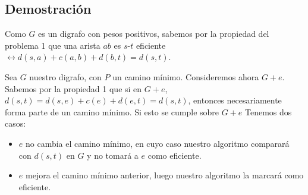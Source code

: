 \documentclass{article}
\begin{document}
\subsection*{Demostración}

Como \( G \) es un digrafo con pesos positivos, sabemos por la propiedad del problema 1 que una arista \( ab \) es \( s \)-\( t \) eficiente \(\leftrightarrow d(s, a) + c(a, b) + d(b, t) = d(s, t) \).

Sea \( G \) nuestro digrafo, con \( P \) un camino mínimo. Consideremos ahora \( G + e \). Sabemos por la propiedad 1 que si en \( G + e \), \( d(s, t) = d(s, e) + c(e) + d(e, t) = d(s, t) \), entonces necesariamente forma parte de un camino mínimo. Si esto se cumple sobre \(G + e\) Tenemos dos casos:

\begin{itemize}
    \item \( e \) no cambia el camino mínimo, en cuyo caso nuestro algoritmo comparará con \( d(s, t) \) en \( G \) y no tomará a \( e \) como eficiente.
    \item \( e \) mejora el camino mínimo anterior, luego nuestro algoritmo la marcará como eficiente.
\end{itemize}
\end{document}
